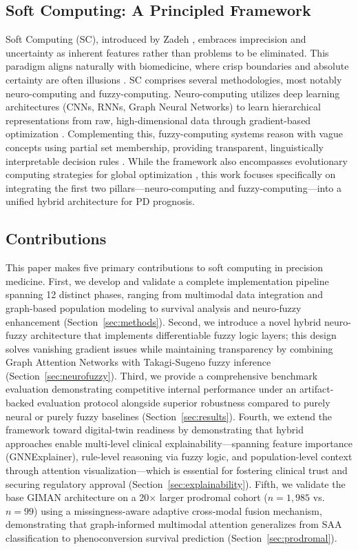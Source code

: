 \documentclass[journal,twoside,web]{ieeecolor}
\begin{document}
\subsection{Soft Computing: A Principled Framework}

Soft Computing (SC), introduced by Zadeh \cite{zadeh1994soft}, embraces imprecision and uncertainty as inherent features rather than problems to be eliminated. This paradigm aligns naturally with biomedicine, where crisp boundaries and absolute certainty are often illusions \cite{torres2006fuzzy}. SC comprises several methodologies, most notably neuro-computing and fuzzy-computing. Neuro-computing utilizes deep learning architectures (CNNs, RNNs, Graph Neural Networks) to learn hierarchical representations from raw, high-dimensional data through gradient-based optimization \cite{lecun2015deep}. Complementing this, fuzzy-computing systems reason with vague concepts using partial set membership, providing transparent, linguistically interpretable decision rules \cite{zadeh1965fuzzy}. While the framework also encompasses evolutionary computing strategies for global optimization \cite{goldberg1989genetic}, this work focuses specifically on integrating the first two pillars---neuro-computing and fuzzy-computing---into a unified hybrid architecture for PD prognosis.

\subsection{Contributions}

This paper makes five primary contributions to soft computing in precision medicine. First, we develop and validate a complete implementation pipeline spanning 12 distinct phases, ranging from multimodal data integration and graph-based population modeling to survival analysis and neuro-fuzzy enhancement (Section~\ref{sec:methods}). Second, we introduce a novel hybrid neuro-fuzzy architecture that implements differentiable fuzzy logic layers; this design solves vanishing gradient issues while maintaining transparency by combining Graph Attention Networks with Takagi-Sugeno fuzzy inference (Section~\ref{sec:neurofuzzy}). Third, we provide a comprehensive benchmark evaluation demonstrating competitive internal performance under an artifact-backed evaluation protocol alongside superior robustness compared to purely neural or purely fuzzy baselines (Section~\ref{sec:results}). Fourth, we extend the framework toward digital-twin readiness by demonstrating that hybrid approaches enable multi-level clinical explainability---spanning feature importance (GNNExplainer), rule-level reasoning via fuzzy logic, and population-level context through attention visualization---which is essential for fostering clinical trust and securing regulatory approval (Section~\ref{sec:explainability}). Fifth, we validate the base GIMAN architecture on a 20$\times$ larger prodromal cohort ($n=1{,}985$ vs.\ $n=99$) using a missingness-aware adaptive cross-modal fusion mechanism, demonstrating that graph-informed multimodal attention generalizes from SAA classification to phenoconversion survival prediction (Section~\ref{sec:prodromal}).
\end{document}
